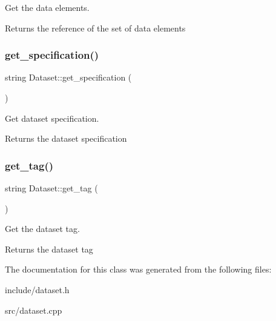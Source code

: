 Get the data elements. \begin{DoxyReturn}{Returns}
the reference of the set of data elements 
\end{DoxyReturn}
\mbox{\label{classDataset_a0d41185e47cb27299a46dec2d3717cb4}} 
\subsubsection{\texorpdfstring{get\+\_\+specification()}{get\_specification()}}
{\footnotesize\ttfamily string Dataset\+::get\+\_\+specification (\begin{DoxyParamCaption}{ }\end{DoxyParamCaption})}

Get dataset specification. \begin{DoxyReturn}{Returns}
the dataset specification 
\end{DoxyReturn}
\mbox{\label{classDataset_a6cb814dbc1aaa07d1a24d326de529302}} 
\subsubsection{\texorpdfstring{get\+\_\+tag()}{get\_tag()}}
{\footnotesize\ttfamily string Dataset\+::get\+\_\+tag (\begin{DoxyParamCaption}{ }\end{DoxyParamCaption})}

Get the dataset tag. \begin{DoxyReturn}{Returns}
the dataset tag 
\end{DoxyReturn}


The documentation for this class was generated from the following files\+:\begin{DoxyCompactItemize}
\item 
include/dataset.\+h\item 
src/dataset.\+cpp\end{DoxyCompactItemize}

